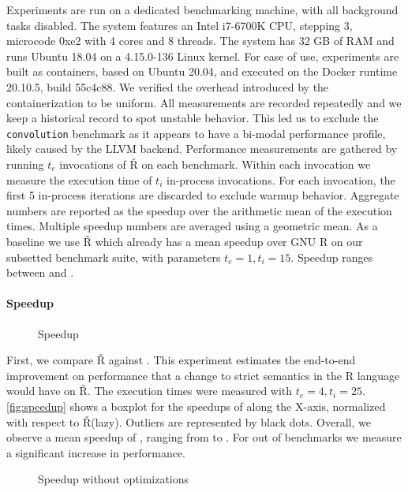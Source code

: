 \documentclass[screen,acmsmall]{acmart}
\renewcommand{\Rsh}{{\sf\v R}\xspace}
\begin{document}
Experiments are run on a dedicated benchmarking machine, with all background
tasks disabled. The system features an Intel i7-6700K CPU, stepping 3, microcode
0xe2 with 4 cores and 8 threads. The system has 32 GB of RAM and runs Ubuntu
18.04 on a 4.15.0-136 Linux kernel. For ease of use, experiments are built as
containers, based on Ubuntu 20.04, and executed on the Docker runtime 20.10.5,
build 55c4c88. We verified the overhead introduced by the containerization to be
uniform. All measurements are recorded repeatedly and we keep a historical
record to spot unstable behavior. This led us to exclude the
\lstinline{convolution} benchmark as it appears to have a bi-modal performance
profile, likely caused by the LLVM backend. Performance measurements are
gathered by running $t_e$ invocations of \Rsh on each benchmark. Within each
invocation we measure the execution time of $t_i$ in-process invocations. For
each invocation, the first 5 in-process iterations are discarded to exclude
warmup behavior. Aggregate numbers are reported as the speedup over the
arithmetic mean of the execution times. Multiple speedup numbers are averaged
using a geometric mean. As a baseline we use \Rsh which already has a
\speedupRsh mean speedup over GNU R on our subsetted benchmark suite, with
parameters $t_e = 1, t_i = 15$. Speedup ranges between \speedupRshMin and
\speedupRshMax.

\paragraph{Speedup}

\begin{figure}[h]
  \centering 
  \caption{Speedup} \label{fig:speedup}
\end{figure}

First, we compare \Rsh against \rshstrict. This experiment estimates the
end-to-end improvement on performance that a change to strict semantics in the R
language would have on \Rsh. The execution times were measured with $t_e = 4,
t_i = 25$. \autoref{fig:speedup} shows a boxplot for the speedups of \rshstrict
along the X-axis, normalized with respect to \Rsh (lazy). Outliers are
represented by black dots. Overall, we observe a mean speedup of
\speedupRshStrict, ranging from \speedupRshStrictMin to \speedupRshStrictMax.
For \speedupRshStrictSignificant out of \benchmarkSuiteSize benchmarks we
measure a significant increase in performance.
%
\begin{figure}[h]
  \centering
  
  \caption{Speedup without optimizations}
  \label{fig:speedup-bc}
\end{figure}
%
\end{document}
